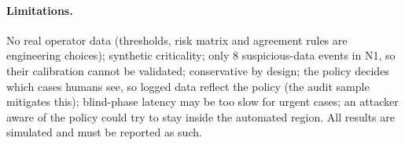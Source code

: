 \paragraph{Limitations.} No real operator data (thresholds, risk matrix and agreement rules are engineering
choices); synthetic criticality; only 8 suspicious-data events in N1, so their calibration cannot be validated;
conservative by design; the policy decides which cases humans see, so logged data reflect the policy (the audit
sample mitigates this); blind-phase latency may be too slow for urgent cases; an attacker aware of the policy could
try to stay inside the automated region. All results are simulated and must be reported as such.
